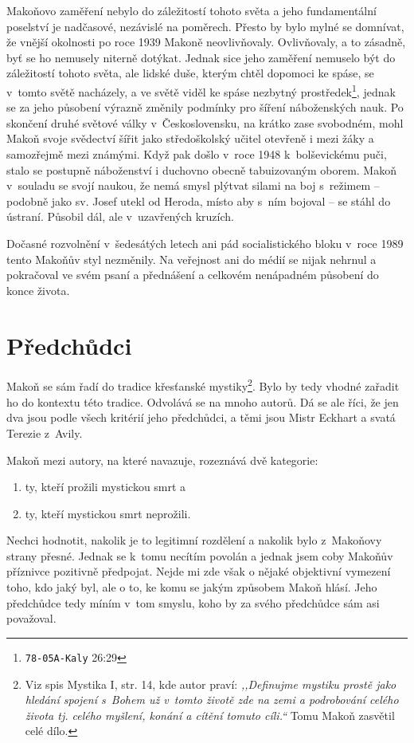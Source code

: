 Makoňovo zaměření nebylo do záležitostí tohoto světa a jeho fundamentální
poselství je nadčasové, nezávislé na poměrech. Přesto by bylo mylné se domnívat,
že vnější okolnosti po roce 1939 Makoně neovlivňovaly. Ovlivňovaly, a to
zásadně, byť se ho nemusely niterně dotýkat. Jednak sice jeho zaměření nemuselo
být do záležitostí tohoto světa, ale lidské duše, kterým chtěl dopomoci ke
spáse, se v~tomto světě nacházely, a ve světě viděl ke spáse nezbytný
prostředek\footnote{\texttt{78-05A-Kaly} 26:29}, jednak se za jeho působení výrazně změnily podmínky pro šíření
náboženských nauk\cite{nevspor2007vceska}. Po skončení druhé světové války v~Československu, na krátko
zase svobodném, mohl Makoň svoje svědectví šířit jako středoškolský učitel
otevřeně i mezi žáky a samozřejmě mezi známými. Když pak došlo v~roce 1948
k~bolševickému puči, stalo se postupně náboženství i duchovno obecně
tabuizovaným oborem\cite{kaplan1993stat}. Makoň v~souladu se svojí naukou, že nemá smysl plýtvat
silami na boj s~režimem -- podobně jako sv. Josef utekl od Heroda, místo aby
s~ním bojoval -- se stáhl do ústraní. Působil dál, ale v~uzavřených kruzích.

Dočasné rozvolnění v~šedesátých letech ani pád socialistického bloku v~roce 1989
tento Makoňův styl nezměnily. Na veřejnost ani do médií se nijak nehrnul a
pokračoval ve svém psaní a přednášení a celkovém nenápadném působení do konce
života.

\section{Předchůdci}

Makoň se sám řadí do tradice křesťanské mystiky\footnote{Viz spis Mystika I,
str. 14, kde autor praví: \textit{,,Definujme mystiku prostě
jako hledání spojení s~Bohem už v~tomto životě zde na zemi a
podrobování celého života tj. celého myšlení, konání a cítění
tomuto cíli.``} Tomu Makoň zasvětil celé dílo.}. Bylo by tedy vhodné zařadit ho
do kontextu této tradice. Odvolává se na mnoho autorů. Dá se ale říci, že jen
dva jsou podle všech kritérií jeho předchůdci, a těmi jsou Mistr Eckhart a svatá
Terezie z~Avily.

Makoň mezi autory, na které navazuje, rozeznává dvě kategorie:
\begin{enumerate}
\item{ty, kteří prožili mystickou smrt a}
\item{ty, kteří mystickou smrt neprožili.}
\end{enumerate}
Nechci hodnotit, nakolik je to legitimní rozdělení a nakolik bylo
z~Makoňovy strany přesné. Jednak se k~tomu necítím povolán a jednak jsem coby
Makoňův příznivce pozitivně předpojat. Nejde mi zde však o nějaké objektivní
vymezení toho, kdo jaký byl, ale o to, ke komu se jakým způsobem Makoň hlásí.
Jeho předchůdce tedy míním v~tom smyslu, koho by za svého předchůdce sám asi
považoval.

